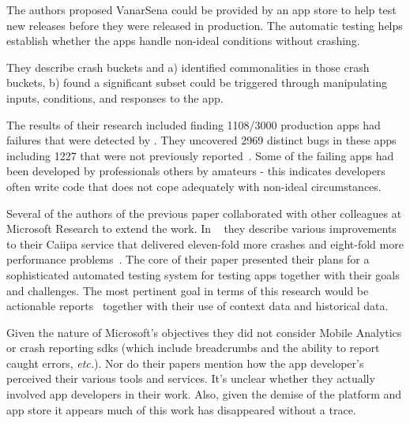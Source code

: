 The authors proposed VanarSena could be provided by an app store to help test new releases before they were released in production. The automatic testing helps establish whether the apps handle non-ideal conditions without crashing.
    
They describe crash buckets and a) identified commonalities in those crash buckets, b) found a significant subset could be triggered through manipulating inputs, conditions, and responses to the app.

The results of their research included finding 1108/3000 production  apps had failures that were detected by . They uncovered 2969 distinct bugs in these apps including 1227 that were not previously reported~. Some of the failing apps had been developed by professionals others by amateurs - this indicates developers often write code that does not cope adequately with non-ideal circumstances.  

\afterpage{\clearpage}

Several of the authors of the previous paper collaborated with other colleagues at Microsoft Research to extend the work. In ~\textcite{chandra2015_how_to_smash_the_next_billion_mobile_app_bugs} they describe various improvements to their Caiipa service that delivered eleven-fold more crashes and eight-fold more performance problems~\cite[pp. 37-38]{chandra2015_how_to_smash_the_next_billion_mobile_app_bugs}. The core of their paper presented their plans for a sophisticated automated testing system for testing  apps together with their goals and challenges. The most pertinent goal in terms of this research would be actionable reports~ together with their use of context data and historical data. 

Given the nature of Microsoft's objectives they did not consider Mobile Analytics or crash reporting \Glspl{sdk} 
(which include breadcrumbs and the ability to report caught errors, \emph{etc.}). Nor do their papers mention how the app developer's perceived their various tools and services. It's unclear whether they actually involved app developers in their work. Also, given the demise of the  platform and app store it appears much of this work has disappeared without a trace.


